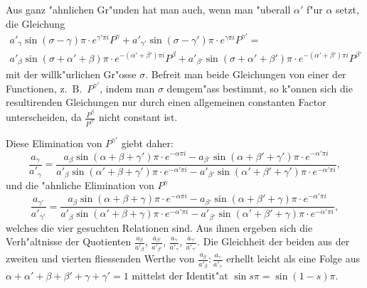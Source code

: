 \documentclass[12pt,a4paper]{book}
\theoremstyle{definition}
\theoremstyle{remark}
\begin{document}
Aus ganz {"a}hnlichen Gr{"u}nden hat man auch, wenn man {"u}berall $\alpha'$ f{"u}r $\alpha$ setzt, die Gleichung
\begin{multline*}
a'_{\gamma} \sin(\sigma - \gamma)\pi \cdot e^{\gamma'\pi i} P^{\gamma} + a'_{\gamma'} \sin(\sigma - \gamma')\pi \cdot e^{\gamma\pi i} P^{\gamma'} = \\
a'_{\beta} \sin(\sigma + \alpha' + \beta)\pi \cdot e^{-(\alpha'+\beta')\pi i} P^{\beta} + a'_{\beta'} \sin(\sigma + \alpha' + \beta')\pi \cdot e^{-(\alpha'+\beta')\pi i} P^{\beta'}
\end{multline*}
mit der willk{"u}rlichen Gr{"o}sse $\sigma$. Befreit man beide Gleichungen von einer der Functionen, z.~B.\ $P^{\gamma'}$, indem man $\sigma$ demgem{"a}ss bestimmt, so k{"o}nnen sich die resultirenden Gleichungen nur durch einen allgemeinen constanten Factor unterscheiden, da $\frac{P^{\beta}}{P^{\beta'}}$ nicht constant ist.

Diese Elimination von $P^{\gamma'}$ giebt daher:
\begin{equation}
\frac{a_{\gamma}}{a'_{\gamma}} = \frac{a_{\beta} \sin(\alpha+\beta+\gamma')\pi \cdot e^{-\alpha\pi i} - a_{\beta'} \sin(\alpha+\beta'+\gamma')\pi \cdot e^{-\alpha'\pi i}}{a'_{\beta} \sin(\alpha'+\beta+\gamma')\pi \cdot e^{-\alpha'\pi i} - a'_{\beta'} \sin(\alpha'+\beta'+\gamma')\pi \cdot e^{-\alpha'\pi i}}, \tag{3}
\end{equation}
und die {"a}hnliche Elimination von $P^{\gamma}$
\begin{equation}
\frac{a_{\gamma'}}{a'_{\gamma'}} = \frac{a_{\beta} \sin(\alpha+\beta+\gamma)\pi \cdot e^{-\alpha\pi i} - a_{\beta'} \sin(\alpha+\beta'+\gamma)\pi \cdot e^{-\alpha'\pi i}}{a'_{\beta} \sin(\alpha'+\beta+\gamma)\pi \cdot e^{-\alpha'\pi i} - a'_{\beta'} \sin(\alpha'+\beta'+\gamma)\pi \cdot e^{-\alpha'\pi i}}, \tag{4}
\end{equation}
welches die vier gesuchten Relationen sind. Aus ihnen ergeben sich die Verh{"a}ltnisse der Quotienten $\frac{a_{\beta}}{a'_{\beta}}$, $\frac{a_{\beta'}}{a'_{\beta'}}$, $\frac{a_{\gamma}}{a'_{\gamma}}$, $\frac{a_{\gamma'}}{a'_{\gamma'}}$. Die Gleichheit der beiden aus der zweiten und vierten fliessenden Werthe von $\frac{a_{\beta}}{a'_{\beta}} : \frac{a_{\gamma}}{a'_{\gamma}}$ erhellt leicht als eine Folge aus $\alpha + \alpha' + \beta + \beta' + \gamma + \gamma' = 1$ mittelst der Identit{"a}t $\sin s\pi = \sin(1-s)\pi$.
\end{document}
